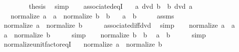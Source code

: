 \begin{isabellebody}
\ \ \ \ \isamarkupfalse%
\ {\isacharasterisk}{\kern0pt}\ \isamarkupfalse%
\ {\isacharquery}{\kern0pt}thesis\ \isamarkupfalse%
\ simp\isanewline
\ \ \isamarkupfalse%
\isanewline
{}\isamarkupfalse%
%
\endisatagproof
{\isafoldproof}%
%
\isadelimproof
\isanewline
%
\endisadelimproof
\isanewline
{}\isamarkupfalse%
\ associated{\isacharunderscore}{\kern0pt}eqI{\isacharcolon}{\kern0pt}\isanewline
\ \ \ {\isachardoublequoteopen}a\ dvd\ b{\isachardoublequoteclose}\ \ {\isachardoublequoteopen}b\ dvd\ a{\isachardoublequoteclose}\isanewline
\ \ \ {\isachardoublequoteopen}normalize\ a\ {\isacharequal}{\kern0pt}\ a{\isachardoublequoteclose}\ \ {\isachardoublequoteopen}normalize\ b\ {\isacharequal}{\kern0pt}\ b{\isachardoublequoteclose}\isanewline
\ \ \ {\isachardoublequoteopen}a\ {\isacharequal}{\kern0pt}\ b{\isachardoublequoteclose}\isanewline
%
\isadelimproof
%
\endisadelimproof
%
\isatagproof
{}\isamarkupfalse%
\ {\isacharminus}{\kern0pt}\isanewline
\ \ \isamarkupfalse%
\ assms\ \isamarkupfalse%
\ {\isachardoublequoteopen}normalize\ a\ {\isacharequal}{\kern0pt}\ normalize\ b{\isachardoublequoteclose}\isanewline
\ \ \ \ \isamarkupfalse%
\ associated{\isacharunderscore}{\kern0pt}iff{\isacharunderscore}{\kern0pt}dvd\ \isamarkupfalse%
\ simp\isanewline
\ \ \isamarkupfalse%
\ {\isacartoucheopen}normalize\ a\ {\isacharequal}{\kern0pt}\ a{\isacartoucheclose}\ \isamarkupfalse%
\ {\isachardoublequoteopen}a\ {\isacharequal}{\kern0pt}\ normalize\ b{\isachardoublequoteclose}\isanewline
\ \ \ \ \isamarkupfalse%
\ simp\isanewline
\ \ \isamarkupfalse%
\ {\isacartoucheopen}normalize\ b\ {\isacharequal}{\kern0pt}\ b{\isacartoucheclose}\ \isamarkupfalse%
\ {\isachardoublequoteopen}a\ {\isacharequal}{\kern0pt}\ b{\isachardoublequoteclose}\isanewline
\ \ \ \ \isamarkupfalse%
\ simp\isanewline
{}\isamarkupfalse%
%
\endisatagproof
{\isafoldproof}%
%
\isadelimproof
\isanewline
%
\endisadelimproof
\isanewline
{}\isamarkupfalse%
\ normalize{\isacharunderscore}{\kern0pt}unit{\isacharunderscore}{\kern0pt}factor{\isacharunderscore}{\kern0pt}eqI{\isacharcolon}{\kern0pt}\isanewline
\ \ \ {\isachardoublequoteopen}normalize\ a\ {\isacharequal}{\kern0pt}\ normalize\ b{\isachardoublequoteclose}\isanewline

\end{isabellebody}
